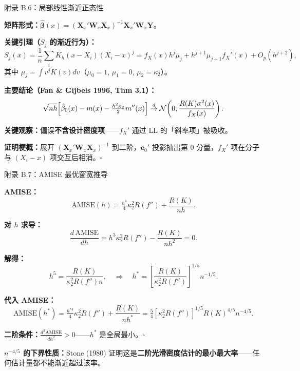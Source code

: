 \documentclass[aspectratio=169, 10pt]{beamer}
\begin{document}
\begin{frame}{附录 B.6：局部线性渐近正态性}
  \hypertarget{proof-b6}{}

  \textbf{矩阵形式：}$\hat{\boldsymbol{\beta}}(x) = (\mathbf{X}_x'\mathbf{W}_x\mathbf{X}_x)^{-1}\mathbf{X}_x'\mathbf{W}_x \mathbf{Y}$。

  \textbf{关键引理（$S_j$ 的渐近行为）：}
  \[
    S_j(x) = \frac{1}{n}\sum_i K_h(x-X_i)(X_i-x)^j = f_X(x) h^j \mu_j + h^{j+1} \mu_{j+1} f_X'(x) + O_p(h^{j+2}),
  \]
  其中 $\mu_j = \int v^j K(v) dv$（$\mu_0=1$, $\mu_1=0$, $\mu_2 = \kappa_2$）。

  \textbf{主要结论（Fan \& Gijbels 1996, Thm 3.1）：}
  \[
    \sqrt{nh}\!\left[\hat\beta_0(x) - m(x) - \tfrac{h^2\kappa_2}{2}m''(x)\right]
    \overset{d}{\to} \mathcal{N}\!\left(0, \frac{R(K)\sigma^2(x)}{f_X(x)}\right).
  \]

  \textbf{关键观察：}偏误\textbf{不含设计密度项}——$f_X'$ 通过 LL 的「斜率项」被吸收。

  \textbf{证明梗概：}展开 $(\mathbf{X}_x'\mathbf{W}_x\mathbf{X}_x)^{-1}$ 到二阶，$\mathbf{e}_0'$ 投影抽出第 0 分量，$f_X'$ 项在分子与 $(X_i-x)$ 项交互后相消。$\square$

  \hfill{\scriptsize\hyperlink{main-b6}{}}
\end{frame}


\begin{frame}{附录 B.7：AMISE 最优窗宽推导}
  \hypertarget{proof-b7}{}

  \textbf{AMISE：}
  \[
    \text{AMISE}(h) = \tfrac{h^4}{4}\kappa_2^2 R(f'') + \frac{R(K)}{nh}.
  \]

  \textbf{对 $h$ 求导：}
  \[
    \frac{d\,\text{AMISE}}{dh} = h^3 \kappa_2^2 R(f'') - \frac{R(K)}{nh^2} = 0.
  \]

  \textbf{解得：}
  \[
    h^5 = \frac{R(K)}{\kappa_2^2 R(f'') n},\quad \Rightarrow\quad
    h^* = \left[\frac{R(K)}{\kappa_2^2 R(f'')}\right]^{1/5} n^{-1/5}.
  \]

  \textbf{代入 AMISE：}
  \[
    \text{AMISE}(h^*) = \tfrac{h^{*4}}{4}\kappa_2^2 R(f'') + \frac{R(K)}{nh^*}
    = \tfrac{5}{4}\left[\kappa_2^2 R(f'')\right]^{1/5} R(K)^{4/5} n^{-4/5}.
  \]

  \textbf{二阶条件：}$\frac{d^2\text{AMISE}}{dh^2} > 0$——$h^*$ 是全局最小。$\square$

  \vspace{0.3em}
  \textbf{$n^{-4/5}$ 的下界性质：}Stone (1980) 证明这是\textbf{二阶光滑密度估计的最小最大率}——任何估计量都不能渐近超过该率。

  \hfill{\scriptsize\hyperlink{main-b7}{}}
\end{frame}
\end{document}
